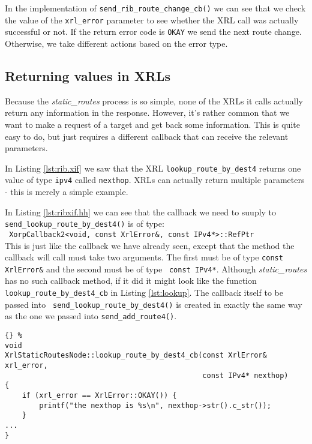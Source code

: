 \documentclass[11pt]{article}
\newcommand{\stt}{\tt\small}
\newcommand{\SRI}{{\it static\_routes}\xspace}
\begin{document}
In the implementation of {\stt send\_rib\_route\_change\_cb()} we can see
that we check the value of the {\stt xrl\_error} parameter to see
whether the XRL call was actually successful or not.
If the return error code is {\stt OKAY} we send the next route change.
Otherwise, we take different actions based on the error type.

\subsection{Returning values in XRLs}

Because the \SRI process is so simple, none of the XRLs it calls
actually return any information in the response.  However, it's rather
common that we want to make a request of a target and get back some
information.  This is quite easy to do, but just requires a different
callback that can receive the relevant parameters.

In Listing \ref{lst:rib.xif} we saw that the XRL
{\stt lookup\_route\_by\_dest4}
returns one value of type {\stt ipv4} called {\stt nexthop}.  XRLs can
actually return multiple parameters - this is merely a simple
example.

In Listing \ref{lst:ribxif.hh} we can see that the callback we need to
suuply to {\stt send\_lookup\_route\_by\_dest4()} is of type:\\ {\stt
XorpCallback2<void, const XrlError\&, const IPv4*>::RefPtr}\\ This is
just like the callback we have already seen, except that the method
the callback will call must take two arguments.  The first must be of
type {\stt const XrlError\&} and the second must be of type {\stt
const IPv4*}.  Although \SRI has no such callback method, if it did it
might look like the function {\stt lookup\_route\_by\_dest4\_cb} in
Listing \ref{lst:lookup}.  The callback itself to be passed into {\stt
send\_lookup\_route\_by\_dest4()} is created in exactly the same way as
the one we passed into {\stt send\_add\_route4()}.

\begin{lstlisting}[caption={Hypothetical callback for  {\stt
	send\_lookup\_route\_by\_dest4()} \label{lst:lookup} }]{} %
void
XrlStaticRoutesNode::lookup_route_by_dest4_cb(const XrlError& xrl_error,
                                              const IPv4* nexthop)
{
    if (xrl_error == XrlError::OKAY()) {
        printf("the nexthop is %s\n", nexthop->str().c_str());
    }
...
}
\end{lstlisting}
\end{document}

